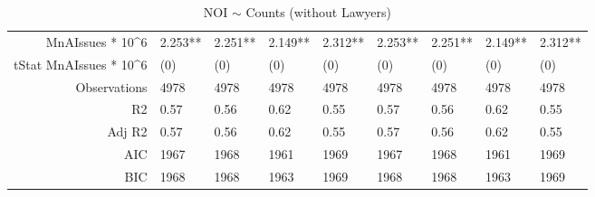 \begin{table}[ht]
\begin{tabular}{rllllllll}
  MnAIssues * 10^6 & 2.253** & 2.251** & 2.149** & 2.312** & 2.253** & 2.251** & 2.149** & 2.312** \\ 
  tStat MnAIssues * 10^6 & (0) & (0) & (0) & (0) & (0) & (0) & (0) & (0) \\ 
  Observations & 4978 & 4978 & 4978 & 4978 & 4978 & 4978 & 4978 & 4978 \\ 
  R2 & 0.57 & 0.56 & 0.62 & 0.55 & 0.57 & 0.56 & 0.62 & 0.55 \\ 
  Adj R2 & 0.57 & 0.56 & 0.62 & 0.55 & 0.57 & 0.56 & 0.62 & 0.55 \\ 
  AIC & 1967 & 1968 & 1961 & 1969 & 1967 & 1968 & 1961 & 1969 \\ 
  BIC & 1968 & 1968 & 1963 & 1969 & 1968 & 1968 & 1963 & 1969 \\ 
   \hline
\end{tabular}
\caption{NOI $\sim$ Counts (without Lawyers)} 
\end{table}
